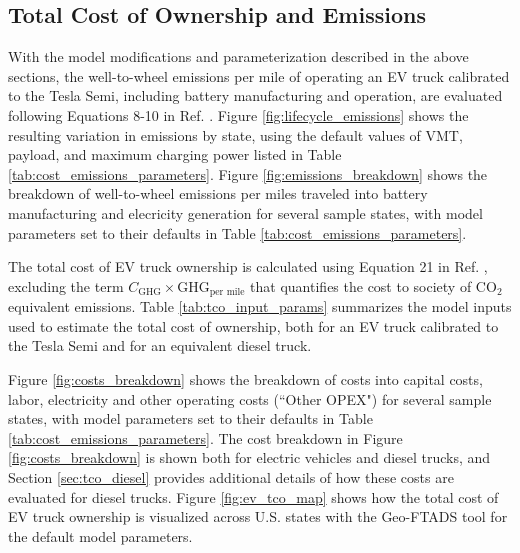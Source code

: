 \subsection{Total Cost of Ownership and Emissions}

With the model modifications and parameterization described in the above sections, the well-to-wheel emissions per mile of operating an EV truck calibrated to the Tesla Semi, including battery manufacturing and operation, are evaluated following Equations 8-10 in Ref. \cite{Sader_2023}. Figure \ref{fig:lifecycle_emissions} shows the resulting variation in emissions by state, using the default values of VMT, payload, and maximum charging power listed in Table \ref{tab:cost_emissions_parameters}. Figure \ref{fig:emissions_breakdown} shows the breakdown of well-to-wheel emissions per miles traveled into battery manufacturing and elecricity generation for several sample states, with model parameters set to their defaults in Table \ref{tab:cost_emissions_parameters}.

The total cost of EV truck ownership is calculated using Equation 21 in Ref. \cite{Sader_2023}, excluding the term $C_\text{GHG}\times\text{GHG}_\text{per mile}$ that quantifies the cost to society of CO$_2$ equivalent emissions. Table \ref{tab:tco_input_params} summarizes the model inputs used to estimate the total cost of ownership, both for an EV truck calibrated to the Tesla Semi and for an equivalent diesel truck. 

Figure \ref{fig:costs_breakdown} shows the breakdown of costs into capital costs, labor, electricity and other operating costs (``Other OPEX") for several sample states, with model parameters set to their defaults in Table \ref{tab:cost_emissions_parameters}. The cost breakdown in Figure \ref{fig:costs_breakdown} is shown both for electric vehicles and diesel trucks, and Section \ref{sec:tco_diesel} provides additional details of how these costs are evaluated for diesel trucks. Figure \ref{fig:ev_tco_map} shows how the total cost of EV truck ownership is visualized across U.S. states with the Geo-FTADS tool for the default model parameters. 

